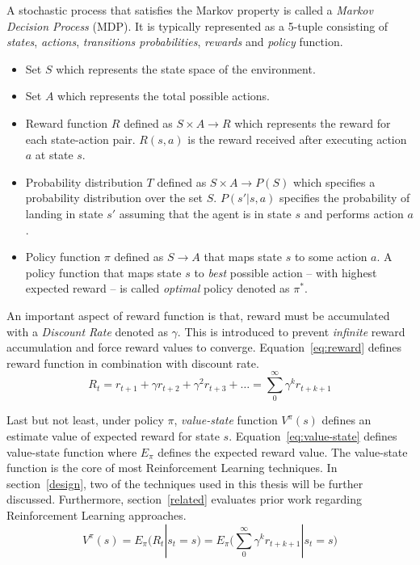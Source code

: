 A stochastic process that satisfies the Markov property is called a \emph{Markov Decision Process} (MDP). It is typically represented as a 5-tuple consisting of \emph{states}, \emph{actions}, \emph{transitions probabilities}, \emph{rewards} and \emph{policy} function.
\begin{itemize}
    \item Set $S$ which represents the state space of the environment.
    \item Set $A$ which represents the total possible actions.
    \item Reward function $R$ defined as $S \times A \rightarrow R$ which represents the reward for each state-action pair. $R(s,a)$ is the reward received after executing action $a$ at state $s$.
    \item Probability distribution $T$ defined as $S \times A \rightarrow P(S)$ which specifies a probability distribution over the set $S$. $P(s'|s,a)$ specifies the probability of landing in state $s'$ assuming that the agent is in state $s$ and performs action $a$.
    \item Policy function $\pi$ defined as $S \rightarrow A$ that maps state $s$ to some action $a$. A policy function that maps state $s$ to \emph{best} possible action -- with highest expected reward -- is called \emph{optimal} policy denoted as $\pi^*$.
\end{itemize}

An important aspect of reward function is that, reward must be accumulated with a \emph{Discount Rate} denoted as $\gamma$. This is introduced to prevent \emph{infinite} reward accumulation and force reward values to converge. Equation~\ref{eq:reward} defines reward function in combination with discount rate.
\begin{equation}
    R_t = r_{t+1}+\gamma r_{t+2}+\gamma^2 r_{t+3}+\dots=\sum_{0}^{\infty}\gamma^k r_{t+k+1}
    \label{eq:reward}
\end{equation}

Last but not least, under policy $\pi$, \emph{value-state} function $V^\pi(s)$ defines an estimate value of expected reward for state $s$. Equation~\ref{eq:value-state} defines value-state function where $E_\pi$ defines the expected reward value. The value-state function is the core of most Reinforcement Learning techniques. In section~\ref{design}, two of the techniques used in this thesis will be further discussed. Furthermore, section~\ref{related} evaluates prior work regarding Reinforcement Learning approaches.
\begin{equation}
V^\pi(s) = E_\pi(R_t|s_t=s)=E_\pi\bigg(\sum_{0}^{\infty}\gamma^k r_{t+k+1}|s_t=s\bigg)
\label{eq:value-state}
\end{equation}

